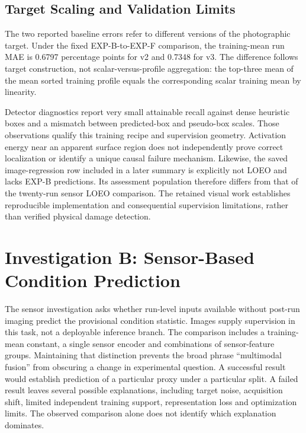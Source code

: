 \subsection{Target Scaling and Validation Limits}
The two reported baseline errors refer to different versions of the photographic target. Under the fixed EXP-B-to-EXP-F comparison, the training-mean run MAE is 0.6797 percentage points for v2 and 0.7348 for v3. The difference follows target construction, not scalar-versus-profile aggregation: the top-three mean of the mean sorted training profile equals the corresponding scalar training mean by linearity.

Detector diagnostics report very small attainable recall against dense heuristic boxes and a mismatch between predicted-box and pseudo-box scales. Those observations qualify this training recipe and supervision geometry. Activation energy near an apparent surface region does not independently prove correct localization or identify a unique causal failure mechanism. Likewise, the saved image-regression row included in a later summary is explicitly not LOEO and lacks EXP-B predictions. Its assessment population therefore differs from that of the twenty-run sensor LOEO comparison. The retained visual work establishes reproducible implementation and consequential supervision limitations, rather than verified physical damage detection.

\section{Investigation B: Sensor-Based Condition Prediction}
The sensor investigation asks whether run-level inputs available without post-run imaging predict the provisional condition statistic. Images supply supervision in this task, not a deployable inference branch. The comparison includes a training-mean constant, a single sensor encoder and combinations of sensor-feature groups. Maintaining that distinction prevents the broad phrase ``multimodal fusion'' from obscuring a change in experimental question. A successful result would establish prediction of a particular proxy under a particular split. A failed result leaves several possible explanations, including target noise, acquisition shift, limited independent training support, representation loss and optimization limits. The observed comparison alone does not identify which explanation dominates.


